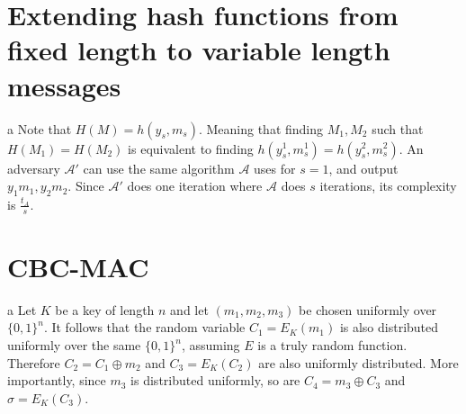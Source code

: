 \documentclass{article}
\begin{document}
\section{Extending hash functions from fixed length to variable length messages}
\begin{paragraph}
	a Note that $H(M) = h(y_s, m_s)$. Meaning that finding $M_1,M_2$ such that $H(M_1) = H(M_2)$
	is equivalent to finding $h(y^1_s, m^1_s) = h(y^2_s, m^2_s)$.
	An adversary $\mathcal{A}'$ can use the same algorithm $\mathcal{A}$ uses for $s = 1$, and output
	$y_1m_1, y_2m_2$.
	Since $\mathcal{A}'$ does one iteration where $\mathcal{A}$ does $s$ iterations, its
	complexity is $\frac{t_A}{s}$.
\end{paragraph}

\section{CBC-MAC}
\begin{paragraph}
	a Let $K$ be a key of length $n$ and let $(m_1, m_2, m_3)$ be chosen uniformly over $\{0, 1\}^n$. It follows that the random variable $C_1 = E_K(m_1)$ is also distributed uniformly over the same $\{0, 1\}^n$, assuming $E$ is a truly random function. Therefore $C_2 = C_1 \oplus m_2$ and $C_3 = E_K(C_2)$ are also uniformly distributed. More importantly, since $m_3$ is distributed uniformly, so are $C_4 = m_3 \oplus C_3$ and $\sigma = E_K(C_3)$.
\end{paragraph}
\end{document}
